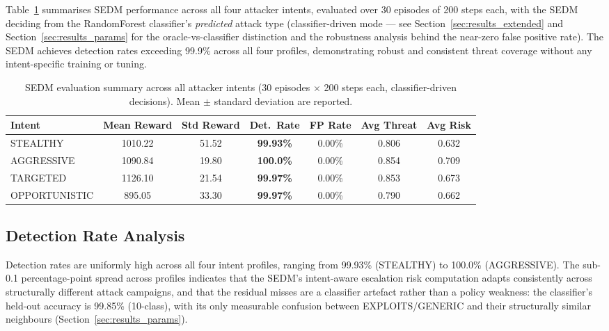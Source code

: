 Table~\ref{tab:eval_summary} summarises SEDM performance across all four
attacker intents, evaluated over 30 episodes of 200 steps each, with the
SEDM deciding from the RandomForest classifier's \emph{predicted} attack
type (classifier-driven mode — see Section~\ref{sec:results_extended} and
Section~\ref{sec:results_params} for the oracle-vs-classifier distinction
and the robustness analysis behind the near-zero false positive rate).
The SEDM achieves detection rates exceeding 99.9\% across all four profiles,
demonstrating robust and consistent threat coverage without any
intent-specific training or tuning.

\begin{table}[ht]
  \centering
  \caption{SEDM evaluation summary across all attacker intents
           (30 episodes $\times$ 200 steps each, classifier-driven decisions).
           Mean $\pm$ standard deviation are reported.}
  \label{tab:eval_summary}
  \begin{tabular}{lcccccc}
    \toprule
    Intent & Mean Reward & Std Reward & Det.\ Rate & FP Rate & Avg Threat & Avg Risk \\
    \midrule
    STEALTHY      & 1010.22 & 51.52 & \textbf{99.93\%} & 0.00\% & 0.806 & 0.632 \\
    AGGRESSIVE    & 1090.84 & 19.80 & \textbf{100.0\%} & 0.00\% & 0.854 & 0.709 \\
    TARGETED      & 1126.10 & 21.54 & \textbf{99.97\%} & 0.00\% & 0.853 & 0.673 \\
    OPPORTUNISTIC &  895.05 & 33.30 & \textbf{99.97\%} & 0.00\% & 0.790 & 0.662 \\
    \bottomrule
  \end{tabular}
\end{table}

\subsection{Detection Rate Analysis}

Detection rates are uniformly high across all four intent profiles,
ranging from 99.93\% (STEALTHY) to 100.0\% (AGGRESSIVE).
The sub-0.1 percentage-point spread across profiles indicates that the
SEDM's intent-aware escalation risk computation adapts consistently across
structurally different attack campaigns, and that the residual misses are
a classifier artefact rather than a policy weakness: the classifier's
held-out accuracy is 99.85\% (10-class), with its only measurable confusion
between EXPLOITS/GENERIC and their structurally similar neighbours
(Section~\ref{sec:results_params}).

